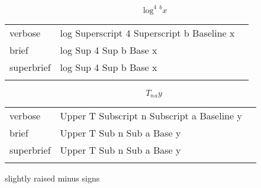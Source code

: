 \R
\E \[\log^4{}^b x\]
\begin{longtable}[c]{@{}lll@{}}
\toprule\addlinespace
verbose & log Superscript 4 Superscript b Baseline x &

\\\addlinespace
brief & log Sup 4 Sup b Base x &

\\\addlinespace
superbrief & log Sup 4 Sup b Base x &

\\\addlinespace
\bottomrule
\end{longtable}


\E \[T_n{}_ay \]
\begin{longtable}[c]{@{}lll@{}}
\toprule\addlinespace
verbose & Upper T Subscript n Subscript a Baseline y &

\\\addlinespace
brief & Upper T Sub n Sub a Base y &

\\\addlinespace
superbrief & Upper T Sub n Sub a Base y &

\\\addlinespace
\bottomrule
\end{longtable}


\R
slightly raised minus signs 

